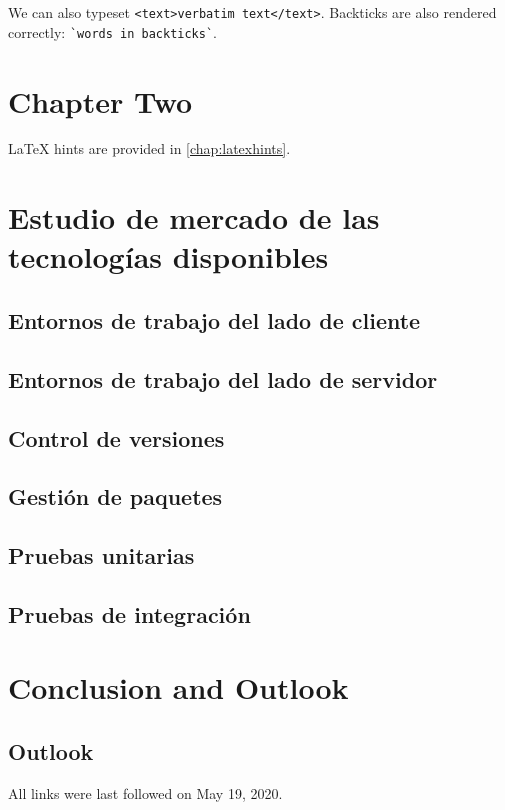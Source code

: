 \documentclass[
  a4paper,  %
  twoside,  %
  bibliography=totoc,
  headsepline,
  cleardoublepage=empty,
  parskip=half,
  draft=false
]{scrbook}
\begin{document}
We can also typeset \verb|<text>verbatim text</text>|.
Backticks are also rendered correctly: \verb|`words in backticks`|.

\chapter{Chapter Two}
\label{chap:k2}

LaTeX hints are provided in \cref{chap:latexhints}.

\chapter{Estudio de mercado de las tecnologías disponibles}
\label{chap:techMarketResearch}

\section{Entornos de trabajo del lado de cliente}



\section{Entornos de trabajo del lado de servidor}



\section{Control de versiones}



\section{Gestión de paquetes}



\section{Pruebas unitarias}



\section{Pruebas de integración}



\blinddocument

\chapter{Conclusion and Outlook}
\label{chap:zusfas}

\section*{Outlook}

\printbibliography

All links were last followed on May 19, 2020.

\appendix


\pagestyle{empty}
\renewcommand*{\chapterpagestyle}{empty}
\Versicherung
\end{document}
